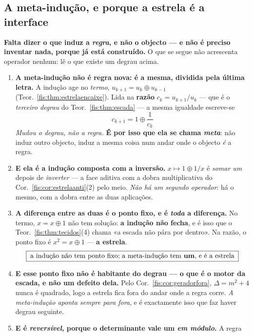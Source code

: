 \documentclass[livro.tex]{subfiles}
\begin{document}
\subsection*{A meta-indução, e porque a estrela é a interface}

\noindent\textbf{Falta dizer o que induz a \emph{regra}, e não o objecto --- e não
é preciso inventar nada, porque já está construído.} O que se segue não
acrescenta operador nenhum: lê o que existe um degrau acima.

\begin{teorema}\label{fis:thm:metainducao}
\begin{enumerate}\itemsep3pt
\item[(1)] \textbf{A meta-indução não é regra nova: é a mesma, dividida pela
última letra.} A indução age no \emph{termo}, $u_{k+1}=u_k\oplus u_{k-1}$
(Teor.~\ref{fis:thm:estrelaencaixe}). Lida na \textbf{razão}
$c_k=u_{k+1}/u_k$ --- que é o \emph{terceiro degrau} do
Teor.~\ref{fis:thm:escada} --- a mesma igualdade escreve-se
\[
\boxed{\;c_{k+1}=1\oplus\frac{1}{c_k}\;}
\]
\emph{Mudou o degrau, não a regra.} \textbf{É por isso que ela se chama
\emph{meta}}: não induz outro objecto, induz a mesma coisa num andar onde o
objecto \emph{é} a regra.
\item[(2)] \textbf{E ela é a indução composta com a inversão.} $x\mapsto1\oplus
1/x$ é \emph{somar um} depois de \emph{inverter} --- a face aditiva com a dobra
multiplicativa do Cor.~\ref{fis:cor:estrelaanti}(2) pelo meio. \emph{Não há um
segundo operador}: há o mesmo, com a dobra entre as duas aplicações.
\item[(3)] \textbf{A diferença entre as duas é o ponto fixo, e é \emph{toda} a
diferença.} No termo, $x=x\oplus1$ não tem solução: \textbf{a indução não fecha},
e é isso que o Teor.~\ref{fis:thm:tecidos}(4) chama «a escada não pára por
dentro». Na razão, o ponto fixo é $x^{2}=x\oplus1$ --- \textbf{a estrela}.
\[
\boxed{\;\text{a indução não tem ponto fixo; a meta-indução tem \textbf{um}, e é a estrela}\;}
\]
\item[(4)] \textbf{E esse ponto fixo não é habitante do degrau --- o que é o
motor da escada, e não um defeito dela.} Pelo Cor.~\ref{fis:cor:geradorfora},
$\Delta=m^{2}+4$ nunca é quadrado, logo a estrela fica fora do andar onde a regra
corre. \emph{A meta-indução aponta sempre para fora}, e é exactamente isso que
faz haver degrau seguinte.
\item[(5)] \textbf{E é \emph{reversível}, porque o determinante vale um \emph{em módulo}.} A regra

\end{enumerate}
\end{teorema}
\end{document}
